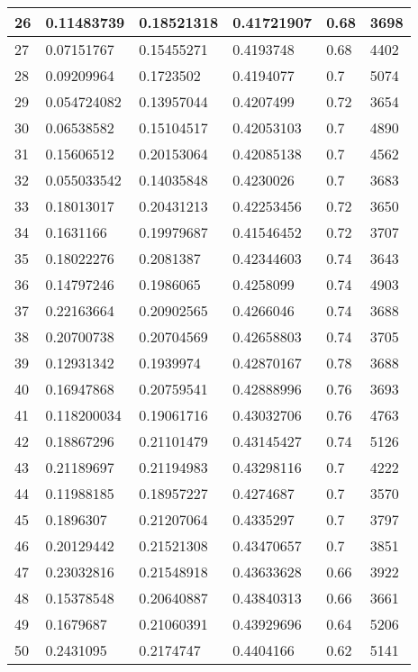 \begin{longtable}{|l|l|l|l|l|l|}
26 & 0.11483739 & 0.18521318 & 0.41721907 & 0.68 & 3698 \\ \hline 
27 & 0.07151767 & 0.15455271 & 0.4193748 & 0.68 & 4402 \\ \hline 
28 & 0.09209964 & 0.1723502 & 0.4194077 & 0.7 & 5074 \\ \hline 
29 & 0.054724082 & 0.13957044 & 0.4207499 & 0.72 & 3654 \\ \hline 
30 & 0.06538582 & 0.15104517 & 0.42053103 & 0.7 & 4890 \\ \hline 
31 & 0.15606512 & 0.20153064 & 0.42085138 & 0.7 & 4562 \\ \hline 
32 & 0.055033542 & 0.14035848 & 0.4230026 & 0.7 & 3683 \\ \hline 
33 & 0.18013017 & 0.20431213 & 0.42253456 & 0.72 & 3650 \\ \hline 
34 & 0.1631166 & 0.19979687 & 0.41546452 & 0.72 & 3707 \\ \hline 
35 & 0.18022276 & 0.2081387 & 0.42344603 & 0.74 & 3643 \\ \hline 
36 & 0.14797246 & 0.1986065 & 0.4258099 & 0.74 & 4903 \\ \hline 
37 & 0.22163664 & 0.20902565 & 0.4266046 & 0.74 & 3688 \\ \hline 
38 & 0.20700738 & 0.20704569 & 0.42658803 & 0.74 & 3705 \\ \hline 
39 & 0.12931342 & 0.1939974 & 0.42870167 & 0.78 & 3688 \\ \hline 
40 & 0.16947868 & 0.20759541 & 0.42888996 & 0.76 & 3693 \\ \hline 
41 & 0.118200034 & 0.19061716 & 0.43032706 & 0.76 & 4763 \\ \hline 
42 & 0.18867296 & 0.21101479 & 0.43145427 & 0.74 & 5126 \\ \hline 
43 & 0.21189697 & 0.21194983 & 0.43298116 & 0.7 & 4222 \\ \hline 
44 & 0.11988185 & 0.18957227 & 0.4274687 & 0.7 & 3570 \\ \hline 
45 & 0.1896307 & 0.21207064 & 0.4335297 & 0.7 & 3797 \\ \hline 
46 & 0.20129442 & 0.21521308 & 0.43470657 & 0.7 & 3851 \\ \hline 
47 & 0.23032816 & 0.21548918 & 0.43633628 & 0.66 & 3922 \\ \hline 
48 & 0.15378548 & 0.20640887 & 0.43840313 & 0.66 & 3661 \\ \hline 
49 & 0.1679687 & 0.21060391 & 0.43929696 & 0.64 & 5206 \\ \hline 
50 & 0.2431095 & 0.2174747 & 0.4404166 & 0.62 & 5141 \\ \hline 
\end{longtable}
